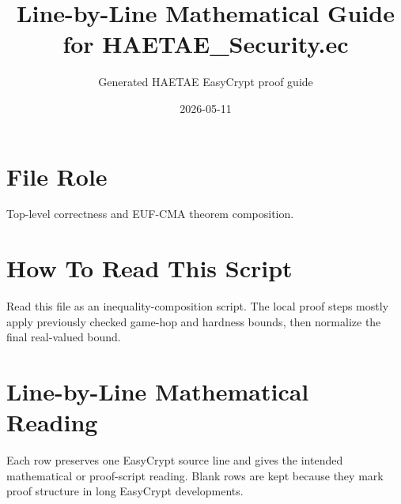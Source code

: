 \documentclass[10pt]{article}
\title{Line-by-Line Mathematical Guide for HAETAE\_Security.ec}
\author{Generated HAETAE EasyCrypt proof guide}
\date{2026-05-11}
\begin{document}
\maketitle

\section*{File Role}
Top-level correctness and EUF-CMA theorem composition.

\section*{How To Read This Script}
Read this file as an inequality-composition script.  The local proof steps mostly apply previously checked game-hop and hardness bounds, then normalize the final real-valued bound.

\section*{Line-by-Line Mathematical Reading}
Each row preserves one EasyCrypt source line and gives the intended mathematical
or proof-script reading.  Blank rows are kept because they mark proof structure
in long EasyCrypt developments.
\end{document}
